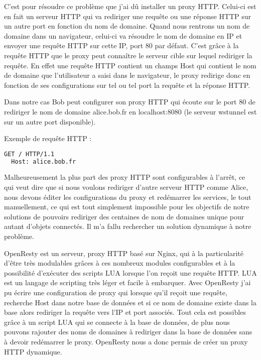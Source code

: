 C'est pour résoudre ce problème que j'ai dû installer un proxy HTTP. Celui-ci est en fait un serveur HTTP qui va rediriger une requête ou une réponse HTTP sur un autre port en fonction du nom de domaine. Quand nous rentrons un nom de domaine dans un navigateur, celui-ci va résoudre le nom de domaine en IP et envoyer une requête HTTP sur cette IP, port 80 par défaut. C'est grâce à la requête HTTP que le proxy peut connaître le serveur cible sur lequel rediriger la requête. En effet une requête HTTP contient un champs \og Host \fg qui contient le nom de domaine que l'utilisateur a saisi dans le navigateur, le proxy redirige donc en fonction de ses configurations sur tel ou tel port la requête et la réponse HTTP.

Dans notre cas Bob peut configurer son proxy HTTP qui écoute sur le port 80 de rediriger le nom de domaine \og alice.bob.fr \fg en \og localhost:8080 \fg (le serveur wstunnel est sur un autre port disponible).

\noindent Exemple de requête HTTP :
\begin{lstlisting}[language=bash]
  GET / HTTP/1.1
  Host: alice.bob.fr
\end{lstlisting}

Malheureusement la plus part des proxy HTTP sont configurables à l'arrêt, ce qui veut dire que si nous voulons rediriger d'autre serveur HTTP comme Alice, nous devons éditer les configurations du proxy et redémarrer les services, le tout manuellement, ce qui est tout simplement impossible pour les objectifs de notre solutions de pouvoirs rediriger des centaines de nom de domaines unique pour autant d'objets connectés. Il m'a fallu rechercher un solution dynamique à notre problème.

OpenResty est un serveur, proxy HTTP basé sur Nginx, qui à la particularité d'être très modulables grâces à ces nombreux modules configurables et à la possibilité d'exécuter des scripts LUA lorsque l'on reçoit une requête HTTP. LUA est un langage de scripting très léger et facile à embarquer. Avec OpenResty j'ai pu écrire une configuration de proxy qui lorsque qu'il reçoit une requête, recherche \og Host \fg dans notre base de données et si ce nom de domaine existe dans la base alors rediriger la requête vers l'IP et port associés. Tout cela est possibles grâce à un script LUA qui se connecte à la base de données, de plus nous pouvons rajouter des noms de domaines à rediriger dans la base de données sans à devoir redémarrer le proxy. OpenResty nous a donc permis de créer un proxy HTTP dynamique.

